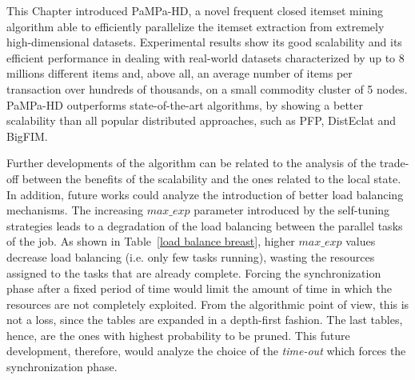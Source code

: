 This Chapter introduced PaMPa-HD,
a novel frequent closed itemset mining algorithm
able to efficiently parallelize the itemset extraction from extremely
high-dimensional datasets.
Experimental results show its good scalability
and its efficient performance in dealing with real-world datasets
characterized by up to 8 millions different items
and, above all, an average number of items per transaction
over hundreds of thousands,
on a small commodity cluster of 5 nodes.
PaMPa-HD outperforms state-of-the-art algorithms, by showing a better
scalability than all popular distributed approaches, such as PFP,
DistEclat and BigFIM.

Further developments of the algorithm can be related to the analysis of the trade-off between the benefits of the scalability and the ones related to the local state. 
In addition, future works could analyze the introduction of better load balancing mechanisms. The increasing $max\_exp$ parameter introduced by the self-tuning strategies leads to a degradation of the load balancing between the parallel tasks of the job. As shown in Table~\ref{load balance breast}, higher $max\_exp$ values decrease load balancing (i.e. only few tasks running), wasting the resources assigned to the tasks that are already complete.
Forcing the synchronization phase after a fixed period of time would limit the amount of time in which the resources are not completely exploited. From the algorithmic point of view, this is not a loss, since the tables are expanded in a depth-first fashion. The last tables, hence, are the ones with highest probability to be pruned. This future development, therefore, would analyze the choice of the \textit{time-out} which forces the synchronization phase.

